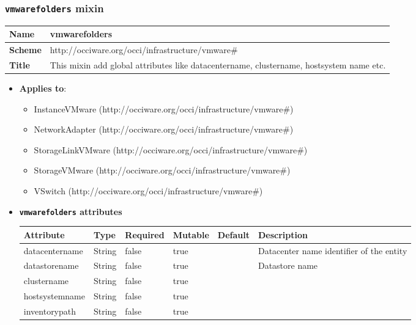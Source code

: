  
\subsubsection{\texttt{vmwarefolders} mixin}
\begin{center}
\begin{tabular}{|l|l|}
  \hline
  \textbf{Name} & vmwarefolders \\
  \hline  
  \textbf{Scheme} & http://occiware.org/occi/infrastructure/vmware\# \\
  \hline
  \textbf{Title} & This mixin add global attributes like datacentername, clustername, hostsystem name etc. \\
  \hline
\end{tabular}
\end{center}
\begin{itemize}
\item \textbf{Applies to}:
\begin{itemize}
	\item InstanceVMware (http://occiware.org/occi/infrastructure/vmware\#)
	\item NetworkAdapter (http://occiware.org/occi/infrastructure/vmware\#)
	\item StorageLinkVMware (http://occiware.org/occi/infrastructure/vmware\#)
	\item StorageVMware (http://occiware.org/occi/infrastructure/vmware\#)
	\item VSwitch (http://occiware.org/occi/infrastructure/vmware\#)
\end{itemize}
\end{itemize} 

\begin{itemize}
\item \textbf{\texttt{vmwarefolders} attributes}

\begin{tabularx}{\textwidth}{|l|l|p{1.4cm}|p{1.3cm}|l|X|}
  \hline
  \textbf{Attribute} & \textbf{Type} & \textbf{Required} & \textbf{Mutable} & \textbf{Default} & \textbf{Description} \\
  \hline  
  datacentername & String & false & true &  & Datacenter name identifier of the entity \\
  \hline
  datastorename & String & false & true &  & Datastore name \\
  \hline
  clustername & String & false & true &  &  \\
  \hline
  hostsystemname & String & false & true &  &  \\
  \hline
  inventorypath & String & false & true &  &  \\
  \hline
\end{tabularx}
\end{itemize}


